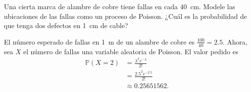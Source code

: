 \question
	Una cierta marca de alambre de cobre tiene fallas en cada \SI{40}{\centi\metre}. Modele las  ubicaciones de las fallas como un proceso de Poisson. ¿Cuál es la probabilidad de que tenga dos defectos en \SI{1}{\centi\metre} de cable?

	\begin{solutionordottedlines}
		El número esperado de fallas en \SI{1}{\metre} de un alambre de cobre es $\tfrac{100}{40}=\num{2.5}$. Ahora, sea $X$ el número de fallas una variable aleatoria de Poisson. El valor pedido es
		\begin{align*}
		\mathds{P}\left(X=2\right)
		&=\frac{\lambda^{2}e^{-\lambda}}{2!}\\
		&=\frac{\num{2.5}^{2}e^{-\num{2.5}}}{2!}\\
		&\approx\num{0.25651562}.
		\end{align*}
	\end{solutionordottedlines}